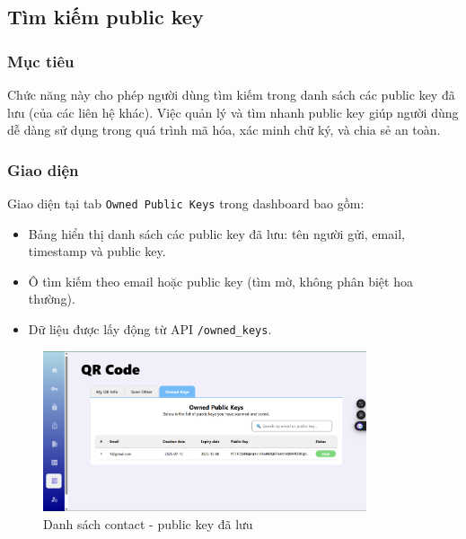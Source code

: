 \newpage
\subsection{Tìm kiếm public key}

\subsubsection*{Mục tiêu}
Chức năng này cho phép người dùng tìm kiếm trong danh sách các public key đã lưu (của các liên hệ khác). Việc quản lý và tìm nhanh public key giúp người dùng dễ dàng sử dụng trong quá trình mã hóa, xác minh chữ ký, và chia sẻ an toàn.

\subsubsection*{Giao diện}
Giao diện tại tab \texttt{Owned Public Keys} trong dashboard bao gồm:
\begin{itemize}
    \item Bảng hiển thị danh sách các public key đã lưu: tên người gửi, email, timestamp và public key.
    \item Ô tìm kiếm theo email hoặc public key (tìm mờ, không phân biệt hoa thường).
    \item Dữ liệu được lấy động từ API \texttt{/owned\_keys}.
\end{itemize}

\begin{figure}[H]
    \centering
    \includegraphics[width=0.85\textwidth]{img/14_pubkey/14_pubkey_ui.png}
    \caption{Danh sách contact - public key đã lưu}
\end{figure}

